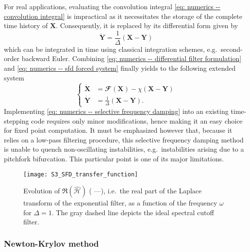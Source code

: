     For real applications, evaluating the convolution integral \eqref{eq: numerics -- convolution integral} is impractical as it necessitates the storage of the complete time history of $\mathbf{X}$. Consequently, it is replaced by its differential form given by
    \begin{equation}
      \dot{\mathbf{Y}} = \displaystyle \frac{1}{\Delta} \left( \mathbf{X} - \mathbf{Y} \right)
      \label{eq: numerics -- differential filter formulation}
    \end{equation}
    which can be integrated in time using classical integration schemes, e.g.\ second-order backward Euler. Combining \eqref{eq: numerics -- differential filter formulation} and \eqref{eq: numerics -- sfd forced system} finally yields to the following extended system
    \begin{equation}
      \left\{
      \begin{aligned}
        \dot{\mathbf{X}} & = \mathbfcal{F}\left( \mathbf{X} \right) - \chi \left( \mathbf{X} - \mathbf{Y} \right) \\
        \dot{\mathbf{Y}} & = \displaystyle \frac{1}{\Delta} \left( \mathbf{X} - \mathbf{Y} \right).
      \end{aligned}
      \right.
      \label{eq: numerics -- selective frequency damping}
    \end{equation}
    Implementing \eqref{eq: numerics -- selective frequency damping} into an existing time-stepping code requires only minor modifications, hence making it an easy choice for fixed point computation. It must be emphasized however that, because it relies on a low-pass filtering procedure, this selective frequency damping method is unable to quench non-oscillating instabilities, e.g.\ instabilities arising due to a pitchfork bifurcation. This particular point is one of its major limitations.

    \begin{figure}[b]
      \sidecaption
      \texttt{[image: S3\_SFD\_transfer\_function]}
      \caption{Evolution of $\Re \left( \hat{\mathcal{H}} \right)$ ({\color{blue} ---}), i.e.\ the real part of the Laplace transform of the exponential filter, as a function of the frequency $\omega$ for $\Delta=1$. The gray dashed line depicts the ideal spectral cutoff filter.}
      \label{fig: numerics -- lapalce transform}
    \end{figure}

    \subsubsection{Newton-Krylov method}

